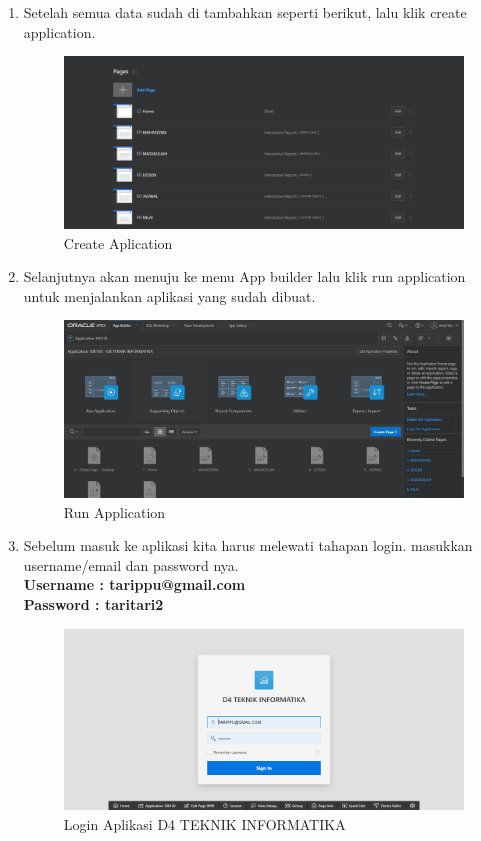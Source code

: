 \begin{enumerate}
    \item Setelah semua data sudah di tambahkan seperti berikut, lalu klik create application.
        \begin{figure}[!htbp]
        \centering
        \includegraphics[width=13cm]{figures/14.PNG}
        \caption{Create Aplication}
    \end{figure}
    
    \newpage
    \item Selanjutnya akan menuju ke menu App builder lalu klik run application untuk menjalankan aplikasi yang sudah dibuat.
        \begin{figure}[!htbp]
        \centering
        \includegraphics[width=13cm]{figures/15.PNG}
        \caption{Run Application}
    \end{figure}
    
    \item Sebelum masuk ke aplikasi kita harus melewati tahapan login. masukkan username/email dan password nya.\\
    \textbf{Username : tarippu@gmail.com}\\
    \textbf{Password : taritari2}
        \begin{figure}[!htbp]
        \centering
        \includegraphics[width=13cm]{figures/16.PNG}
        \caption{Login Aplikasi D4 TEKNIK INFORMATIKA}
    \end{figure}    
    

\end{enumerate}
